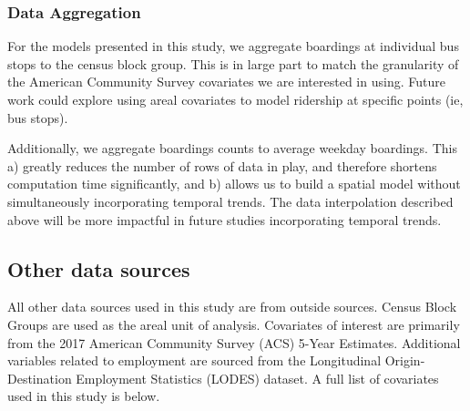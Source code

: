 \documentclass[]{article}
\begin{document}
\subsubsection{Data Aggregation}\label{data-aggregation}

For the models presented in this study, we aggregate boardings at
individual bus stops to the census block group. This is in large part to
match the granularity of the American Community Survey covariates we are
interested in using. Future work could explore using areal covariates to
model ridership at specific points (ie, bus stops).

Additionally, we aggregate boardings counts to average weekday
boardings. This a) greatly reduces the number of rows of data in play,
and therefore shortens computation time significantly, and b) allows us
to build a spatial model without simultaneously incorporating temporal
trends. The data interpolation described above will be more impactful in
future studies incorporating temporal trends.

\subsection{Other data sources}\label{other-data-sources}

All other data sources used in this study are from outside sources.
Census Block Groups are used as the areal unit of analysis. Covariates
of interest are primarily from the 2017 American Community Survey (ACS)
5-Year Estimates. Additional variables related to employment are sourced
from the Longitudinal Origin-Destination Employment Statistics (LODES)
dataset. A full list of covariates used in this study is below.
\end{document}
